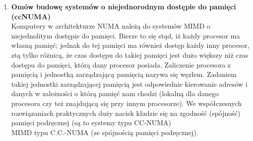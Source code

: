\begin{enumerate}
\begin{itemize}
			\end{itemize}
			\label{itm:potok}
			\item \textbf{Omów budowę systemów o niejednorodnym dostępie do pamięci (ccNUMA)}\\
			Komputery w architekturze NUMA należą do systemów MIMD o niejednolitym dostępie do pamięci. Bierze to się stąd, iż każdy procesor ma własną pamięć; jednak do tej pamięci ma również dostęp każdy inny procesor, ztą tylko różnicą, że czas dostępu do takiej pamięci jest dużo większy niż czas dostępu do pamięci, którą dany procesor posiada. Zaliczenie procesora z pamięcią i jednostką zarządzającą pamięcią nazywa się węzłem. Zadaniem takiej jednostki zarządzającej pamięcią jest odpowiednie kierowanie adresów i danych w zależności o którą pamięć nam chodzi (lokalną dla danego procesora czy też znajdującą się przy innym procesorze). We współczesnych rozwiązaniach praktycznych duży nacisk kładzie się na zgodność (spójność) pamięci podręcznej (są to systemy typu CC-NUMA)\\
			MIMD typu C.C.-NUMA  (ze spójnością pamięci podręcznej).
			

\end{enumerate}
